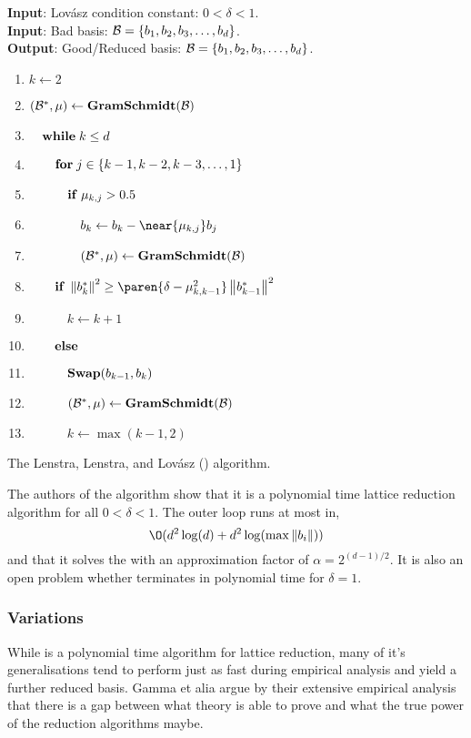 \documentclass{homework}
\begin{document}
\begin{algorithm}
  \begin{flushleft}
    \noindent\textbf{Input}: Lov\'asz condition constant: $0 < \delta < 1$. \\
    \noindent\textbf{Input}: Bad basis: $\mathcal{B} = \{b_1, b_2, b_3, \dots, b_d\}$. \\
    \noindent\textbf{Output}: Good/Reduced basis:
    $\mathcal{B} = \{b_1, b_2, b_3, \dots, b_d\}$.
  \end{flushleft}
  \begin{enumerate}[label=\arabic*:]
    \item $k \leftarrow 2$
    \item $(\mathcal{B}^*, \mu) \leftarrow \mathbf{GramSchmidt}(\mathcal{B})$
    \item $\quad \mathbf{while\;} k \leq d$
    \item $\quad\quad \mathbf{for\;} j \in \{k - 1, k - 2, k - 3, \dots, 1\}$
    \item $\quad\quad\quad \mathbf{if\;} \mu_{k, j} > 0.5$
    \item $\quad\quad\quad\quad b_k \leftarrow b_k - \near{\mu_{k, j}}b_j$
    \item $\quad\quad\quad\quad (\mathcal{B}^*, \mu) \leftarrow \mathbf{GramSchmidt}(\mathcal{B})$
    \item $\quad\quad \IF \norm{b_k^*}^2 \geq
            \paren{\delta - \mu_{k, k-1}^2}\norm{b_{k-1}^*}^2$
    \item $\quad\quad\quad k \leftarrow k + 1$
    \item $\quad\quad \mathbf{else\;}$
    \item $\quad\quad\quad \mathbf{Swap}(b_{k-1}, b_k)$
    \item $\quad\quad\quad (\mathcal{B}^*, \mu) \leftarrow \mathbf{GramSchmidt}(\mathcal{B})$
    \item $\quad\quad\quad k \leftarrow \max(k - 1, 2)$
  \end{enumerate}
  \caption{The Lenstra, Lenstra, and Lov\'asz (\LLL) algorithm.}
  \label{lllalg}
\end{algorithm}

The authors \cite{lenstra1982factoring} of the \LLL{} algorithm show
that it is a polynomial time lattice reduction algorithm for all $0 <
\delta < 1$. The outer loop runs at most in,
\[
  \O(d^2\log(d) + d^2\log(\max\norm{b_i}))
\]
and that it solves the \appr\SVP{} with an approximation factor of
$\alpha = 2^{(d-1)/2}$. It is also an open problem whether \LLL{}
terminates in polynomial time for $\delta = 1.$

\subsubsection{\LLL{} Variations} While \LLL{} is a polynomial time
algorithm for lattice reduction, many of it's generalisations tend to
perform just as fast during empirical analysis and yield a further
reduced basis. Gamma et alia argue by their extensive empirical
analysis \cite{gama2008predicting} that there is a gap between what
theory is able to prove and what the true power of the reduction
algorithms maybe.
\end{document}
